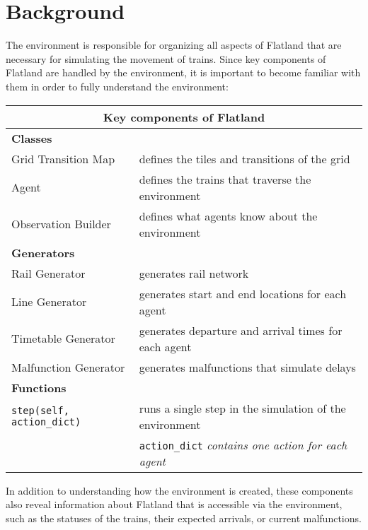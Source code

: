 \section{Background}\label{sec:background}

The environment is responsible for organizing all aspects of Flatland that are necessary for simulating the movement of trains.  Since key components of Flatland are handled by the environment, it is important to become familiar with them in order to fully understand the environment: \\

\begin{table}[H]
\centering
	{\footnotesize
  	\begin{tabular}{@{\hspace*{1em}}ll@{}}
    	\toprule \toprule
    	\multicolumn{2}{c}{Key components of Flatland} \\

    	\midrule

    	\textbf{Classes} \\
    	\tabitem Grid Transition Map & defines the tiles and transitions of the grid \\
    	\tabitem Agent & defines the trains that traverse the environment \\
    	\tabitem Observation Builder & defines what agents know about the environment \\[.75\normalbaselineskip]
    
	\textbf{Generators} \\
    	\tabitem Rail Generator & generates rail network \\
	\tabitem Line Generator & generates start and end locations for each agent \\
    	\tabitem Timetable Generator & generates departure and arrival times for each agent \\
	\tabitem Malfunction Generator & generates malfunctions that simulate delays \\[.75\normalbaselineskip]
    
	\textbf{Functions} \\
	\tabitem \texttt{step(self, action\_dict)} & runs a single step in the simulation of the environment \\
	 & \texttt{action\_dict} \textit{contains one action for each agent} \\

	\bottomrule
  	\end{tabular}
	}
\end{table}

\noindent In addition to understanding how the environment is created, these components also reveal information about Flatland that is accessible via the environment, such as the statuses of the trains, their expected arrivals, or current malfunctions.
